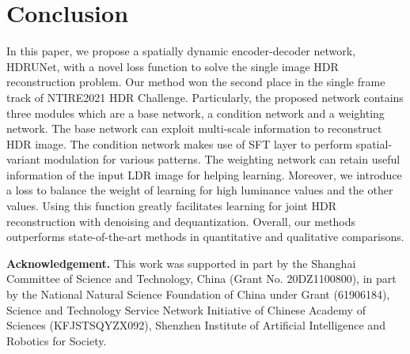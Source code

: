 \documentclass[final]{cvpr}
\begin{document}
\begin{table}[htbp]
	\begin{center}
\setlength{}
	\end{center}
	\caption{Results of the top5 methods in the challenge.}
	\vspace{-10pt}
	\label{tab:competition results}
\end{table}

\section{Conclusion}
In this paper, we propose a spatially dynamic encoder-decoder network, HDRUNet, with a novel  loss function to solve the single image HDR reconstruction problem. Our method won the second place in the single frame track of NTIRE2021 HDR Challenge. Particularly, the proposed network contains three modules which are a base network, a condition network and a weighting network. The base network can exploit multi-scale information to reconstruct HDR image. The condition network makes use of SFT layer to perform spatial-variant modulation for various patterns. The weighting network can retain useful information of the input LDR image for helping learning. Moreover, we introduce a  loss to balance the weight of learning for high luminance values and the other values. Using this function greatly facilitates learning for joint HDR reconstruction with denoising and dequantization. Overall, our methods outperforms state-of-the-art methods in quantitative and qualitative comparisons.

\textbf{Acknowledgement.} This work was supported in part by the Shanghai Committee of Science and Technology, China (Grant No. 20DZ1100800), in part by the National Natural Science Foundation of China under Grant (61906184), Science and Technology Service Network Initiative of Chinese Academy of Sciences (KFJSTSQYZX092), Shenzhen Institute of Artificial Intelligence and Robotics for Society.

\clearpage
{\small


}
\end{document}

